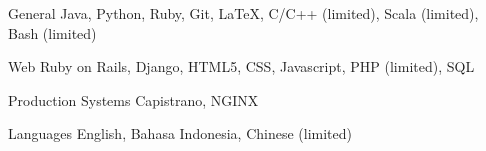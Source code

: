 


\begin{cvskills}


	\cvskill
	{General}
	{Java, Python, Ruby, Git, LaTeX, C/C++ (limited), Scala (limited), Bash (limited)}


	\cvskill
	{Web}
	{Ruby on Rails, Django, HTML5, CSS, Javascript, PHP (limited), SQL}


	\cvskill
	{Production Systems}
	{Capistrano, NGINX}


	\cvskill
	{Languages}
	{English, Bahasa Indonesia, Chinese (limited)}


\end{cvskills}
